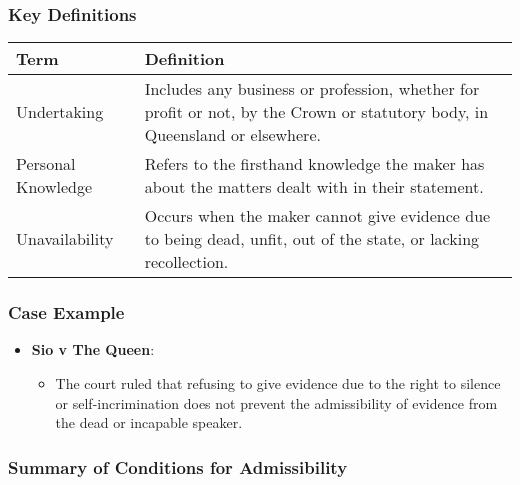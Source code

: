 \subsubsection{Key Definitions}\label{key-definitions-1}

\begin{longtable}[]{@{}
  >{\raggedright\arraybackslash}p{}
  >{\raggedright\arraybackslash}p{}@{}}
\toprule\noalign{}
\begin{minipage}[b]{\linewidth}\raggedright
Term
\end{minipage} & \begin{minipage}[b]{\linewidth}\raggedright
Definition
\end{minipage} \\
\midrule\noalign{}
\endhead
\bottomrule\noalign{}
\endlastfoot
Undertaking & Includes any business or profession, whether for profit or
not, by the Crown or statutory body, in Queensland or elsewhere. \\
Personal Knowledge & Refers to the firsthand knowledge the maker has
about the matters dealt with in their statement. \\
Unavailability & Occurs when the maker cannot give evidence due to being
dead, unfit, out of the state, or lacking recollection. \\
\end{longtable}

\subsubsection{Case Example}\label{case-example}

\begin{itemize}
\tightlist
\item
  \textbf{Sio v The Queen}:

  \begin{itemize}
  \tightlist
  \item
    The court ruled that refusing to give evidence due to the right to
    silence or self-incrimination does not prevent the admissibility of
    evidence from the dead or incapable speaker.
  \end{itemize}
\end{itemize}

\subsubsection{Summary of Conditions for
Admissibility}\label{summary-of-conditions-for-admissibility}

